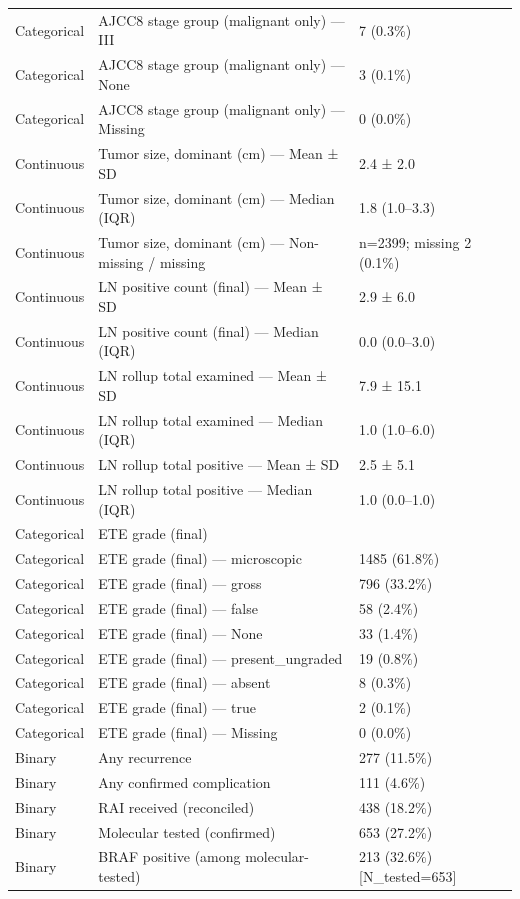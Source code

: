 \begin{table}[htbp]
\begin{tabular}{lll}
Categorical & AJCC8 stage group (malignant only) — III & 7 (0.3\%) \\
Categorical & AJCC8 stage group (malignant only) — None & 3 (0.1\%) \\
Categorical & AJCC8 stage group (malignant only) — Missing & 0 (0.0\%) \\
Continuous & Tumor size, dominant (cm) — Mean ± SD & 2.4 ± 2.0 \\
Continuous & Tumor size, dominant (cm) — Median (IQR) & 1.8 (1.0–3.3) \\
Continuous & Tumor size, dominant (cm) — Non-missing / missing & n=2399; missing 2 (0.1\%) \\
Continuous & LN positive count (final) — Mean ± SD & 2.9 ± 6.0 \\
Continuous & LN positive count (final) — Median (IQR) & 0.0 (0.0–3.0) \\
Continuous & LN rollup total examined — Mean ± SD & 7.9 ± 15.1 \\
Continuous & LN rollup total examined — Median (IQR) & 1.0 (1.0–6.0) \\
Continuous & LN rollup total positive — Mean ± SD & 2.5 ± 5.1 \\
Continuous & LN rollup total positive — Median (IQR) & 1.0 (0.0–1.0) \\
Categorical & ETE grade (final) &  \\
Categorical & ETE grade (final) — microscopic & 1485 (61.8\%) \\
Categorical & ETE grade (final) — gross & 796 (33.2\%) \\
Categorical & ETE grade (final) — false & 58 (2.4\%) \\
Categorical & ETE grade (final) — None & 33 (1.4\%) \\
Categorical & ETE grade (final) — present\_ungraded & 19 (0.8\%) \\
Categorical & ETE grade (final) — absent & 8 (0.3\%) \\
Categorical & ETE grade (final) — true & 2 (0.1\%) \\
Categorical & ETE grade (final) — Missing & 0 (0.0\%) \\
Binary & Any recurrence & 277 (11.5\%) \\
Binary & Any confirmed complication & 111 (4.6\%) \\
Binary & RAI received (reconciled) & 438 (18.2\%) \\
Binary & Molecular tested (confirmed) & 653 (27.2\%) \\
Binary & BRAF positive (among molecular-tested) & 213 (32.6\%) [N\_tested=653] \\

\end{tabular}
\end{table}
